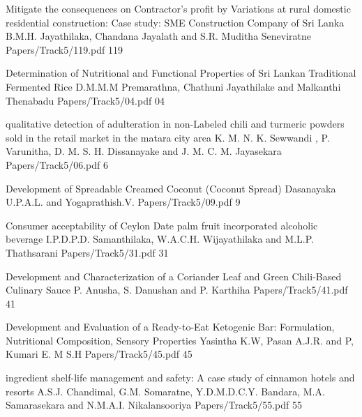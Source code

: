 
        \addpaper
    	{Mitigate the consequences on Contractor's profit by Variations at rural domestic residential construction: Case study: SME Construction Company of Sri Lanka}
   		 {B.M.H. Jayathilaka, Chandana Jayalath and S.R. Muditha Seneviratne} 
   		 {Papers/Track5/119.pdf}
        {119}

        \addpaper
    	{Determination of Nutritional and Functional Properties of Sri Lankan Traditional Fermented Rice}
   		 {D.M.M.M Premarathna, Chathuni Jayathilake and Malkanthi
         Thenabadu} 
   		 {Papers/Track5/04.pdf}
        {04}

        \addpaper
    	{qualitative detection of adulteration in non-Labeled chili and turmeric powders sold in the retail market in the matara city area}
   		 {K. M. N. K. Sewwandi , P. Varunitha, D. M. S. H. Dissanayake and
          J. M. C. M. Jayasekara} 
   		 {Papers/Track5/06.pdf}
        {6}

        \addpaper
    	{Development of Spreadable Creamed Coconut (Coconut Spread)}
   		 {Dasanayaka U.P.A.L. and Yogaprathish.V.} 
   		 {Papers/Track5/09.pdf}
        {9}

        \addpaper
    	{Consumer acceptability of Ceylon Date palm fruit incorporated alcoholic beverage}
   		 {I.P.D.P.D. Samanthilaka, W.A.C.H. Wijayathilaka and M.L.P. Thathsarani} 
   		 {Papers/Track5/31.pdf}
        {31}


        \addpaper
    	{Development and Characterization of a Coriander Leaf and Green Chili-Based Culinary Sauce}
   		 {P. Anusha, S. Danushan and P. Karthiha} 
   		 {Papers/Track5/41.pdf}
        {41}

        \addpaper
    	{Development and Evaluation of a Ready-to-Eat Ketogenic Bar: Formulation, Nutritional Composition, Sensory Properties}
   		 {Yasintha K.W, Pasan A.J.R. and P, Kumari E. M S.H} 
   		 {Papers/Track5/45.pdf}
        {45}

        \addpaper
    	{ingredient shelf-life management and safety: A case study of cinnamon hotels and resorts}
   		 {A.S.J. Chandimal, G.M. Somaratne, Y.D.M.D.C.Y. Bandara,
M.A. Samarasekara and N.M.A.I. Nikalansooriya} 
   		 {Papers/Track5/55.pdf}
        {55}


